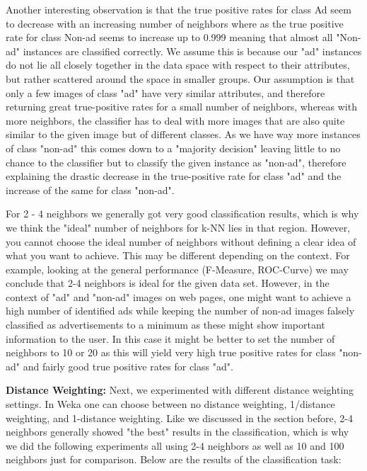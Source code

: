 \documentclass{sig-alternate-05-2015}
\begin{document}
Another interesting observation is that the true positive rates for class Ad seem to decrease with an increasing number of neighbors where as the true positive rate for class Non-ad seems to increase up to 0.999 meaning that almost all "Non-ad" instances are classified correctly. We assume this is because our "ad" instances do not lie all closely together in the data space with respect to their attributes, but rather scattered around the space in smaller groups. Our assumption is that only a few images of class "ad" have very similar attributes, and therefore returning great true-positive rates for a small number of neighbors, whereas with more neighbors, the classifier has to deal with more images that are also quite similar to the given image but of different classes. As we have way more instances of class "non-ad" this comes down to a "majority decision" leaving little to no chance to the classifier but to classify the given instance as "non-ad", therefore explaining the drastic decrease in the true-positive rate for class "ad" and the increase of the same for class "non-ad".

For 2 - 4 neighbors we generally got very good classification results, which is why we think the "ideal" number of neighbors for k-NN lies in that region. However, you cannot choose the ideal number of neighbors without defining a clear idea of what you want to achieve. This may be different depending on the context. For example, looking at the general performance (F-Measure, ROC-Curve) we may conclude that 2-4 neighbors is ideal for the given data set. However, in the context of "ad" and "non-ad" images on web pages, one might want to achieve a high number of identified ads while keeping the number of non-ad images falsely classified  as advertisements to a minimum as these might show important information to the user. In this case it might be better to set the number of neighbors to 10 or 20 as this will yield very high true positive rates for class "non-ad" and fairly good true positive rates for class "ad". 

\textbf{Distance Weighting:}
Next, we experimented with different distance weighting settings. In Weka one can choose between no distance weighting, 1/distance weighting, and 1-distance weighting. Like we discussed in the section before, 2-4 neighbors generally showed "the best" results in the classification, which is why we did the following experiments all using 2-4 neighbors as well as 10 and 100 neighbors just for comparison. Below are the results of the classification task:
\end{document}
